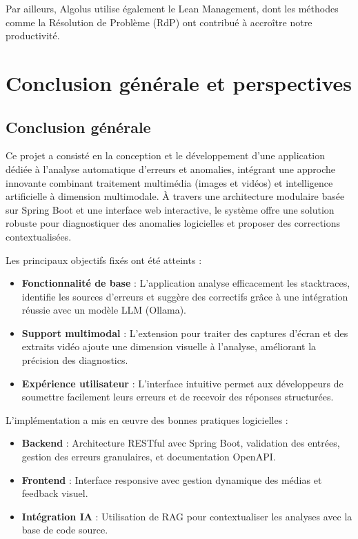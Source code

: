 \documentclass[12pt,a4paper]{report}
\begin{document}
	Par ailleurs, Algolus utilise également le Lean Management, dont les méthodes comme la Résolution de Problème (RdP) ont contribué à accroître notre productivité.
	
	\chapter*{Conclusion générale et perspectives}
	
	\section*{Conclusion générale}
	
	Ce projet a consisté en la conception et le développement d'une application dédiée à l'analyse automatique d'erreurs et anomalies, intégrant une approche innovante combinant traitement multimédia (images et vidéos) et intelligence artificielle à dimension multimodale. À travers une architecture modulaire basée sur Spring Boot et une interface web interactive, le système offre une solution robuste pour diagnostiquer des anomalies logicielles et proposer des corrections contextualisées.
	
	Les principaux objectifs fixés ont été atteints :  
	
	\begin{itemize}
		
		\item \textbf{Fonctionnalité de base} : L'application analyse efficacement les stacktraces,  identifie les sources d'erreurs et suggère des correctifs grâce à une intégration réussie avec un modèle LLM (Ollama).
		
		\item \textbf{Support multimodal} : L'extension pour traiter des captures d'écran et des extraits vidéo ajoute une dimension visuelle à l'analyse, améliorant la précision des diagnostics.
		
		\item \textbf{Expérience utilisateur} : L'interface intuitive permet aux développeurs de soumettre facilement leurs erreurs et de recevoir des réponses structurées.
		
	\end{itemize}

	L'implémentation a mis en œuvre des bonnes pratiques logicielles :
	
	\begin{itemize}
		
		\item \textbf{Backend} : Architecture RESTful avec Spring Boot, validation des entrées, gestion des erreurs granulaires, et documentation OpenAPI.
		
		\item \textbf{Frontend} : Interface responsive avec gestion dynamique des médias et feedback visuel.
		
		\item \textbf{Intégration IA} : Utilisation de RAG pour contextualiser les analyses avec la base de code source. 
		
	\end{itemize}
	
\end{document}
